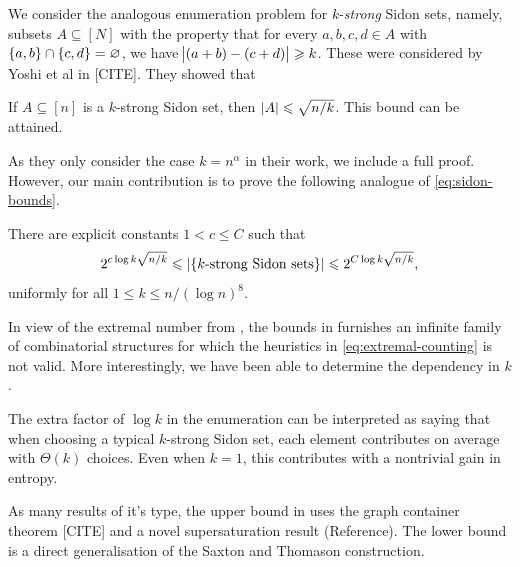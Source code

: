 \documentclass[reqno,a4paper,12pt]{amsart}
\begin{document}
We consider the analogous enumeration problem for $k$-\emph{strong} Sidon sets, namely, subsets $A \subseteq [N]$ with the property that for every $a,b,c,d \in A$ with $\lbrace a,b\rbrace \cap \lbrace c,d\rbrace = \varnothing$, we have $\abs{(a + b) - (c + d)} \geqslant k$.
These were considered by Yoshi et al in [CITE].
They showed that

\begin{theorem}
    \label{thm:disjointly disjointly $k$-Sidon-extremal}
    If $A \subseteq [n]$ is a $k$-strong Sidon set, then $\lvert A\rvert \leqslant \sqrt{n/k}$.
    This bound can be attained.
\end{theorem}

As they only consider the case $k = n^{\alpha}$ in their work, we include a full proof.
However, our main contribution is to prove the following analogue of \eqref{eq:sidon-bounds}.

\begin{theorem}
    \label{thm:disjointly disjointly $k$-Sidon-enumeration}
    There are explicit constants $1 < c \leq C$ such that
    \begin{equation*}
        2^{c \log k \sqrt{n/k}} \leqslant \lvert\lbrace\text{$k$-strong Sidon sets}\rbrace\rvert \leqslant 2^{C \log k \sqrt{n/k}},
    \end{equation*}
    uniformly for all $1 \leq k \leq n/(\log n)^8$.
\end{theorem}

In view of the extremal number from , the bounds in  furnishes an infinite family of combinatorial structures for which the heuristics in \eqref{eq:extremal-counting} is not valid.
More interestingly, we have been able to determine the dependency in $k$.

The extra factor of $\log k$ in the enumeration can be interpreted as saying that when choosing a typical $k$-strong Sidon set, each element contributes on average with $\Theta(k)$ choices.
Even when $k = 1$, this contributes with a nontrivial gain in entropy.

As many results of it's type, the upper bound in  uses the graph container theorem [CITE] and a novel supersaturation result (Reference).
The lower bound is a direct generalisation of the Saxton and Thomason construction.
\end{document}
